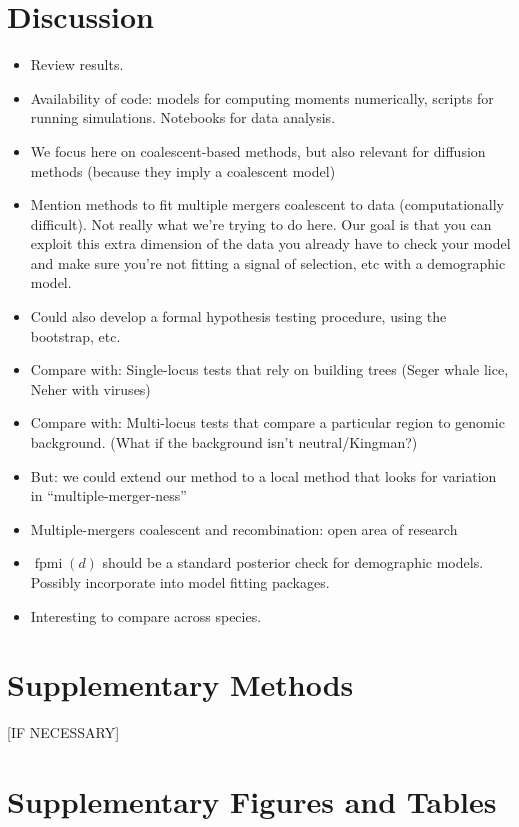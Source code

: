 \documentclass[11pt, letterpaper]{article}   	%
\DeclareMathOperator{\fpmi}{fpmi}
\begin{document}
\section*{Discussion}
\begin{itemize}
    \item Review results.
    \item Availability of code: models for computing moments numerically, scripts for running simulations. Notebooks for data analysis.
    \item We focus here on coalescent-based methods, but also relevant for diffusion methods (because they imply a coalescent model)
    \item Mention methods to fit multiple mergers coalescent to data (computationally difficult). Not really what we're trying to do here. Our goal is that you can exploit this extra dimension of the data you already have to check your model and make sure you're not fitting a signal of selection, etc with a demographic model.
    \item Could also develop a formal hypothesis testing procedure, using the bootstrap, etc.
    \item Compare with: Single-locus tests that rely on building trees (Seger whale lice, Neher with viruses)
    \item Compare with: Multi-locus tests that compare a particular region to genomic background. (What if the background isn't neutral/Kingman?)
    \item But: we could extend our method to a local method that looks for variation in ``multiple-merger-ness''
    \item Multiple-mergers coalescent and recombination: open area of research
    \item $\fpmi(d)$ should be a standard posterior check for demographic models. Possibly incorporate into model fitting packages.
    \item Interesting to compare across species.
\end{itemize}

\printbibliography

\section*{Supplementary Methods}
[IF NECESSARY]

\clearpage

\section*{Supplementary Figures and Tables}
\end{document}
